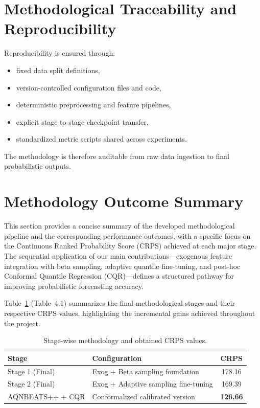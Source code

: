 \section{Methodological Traceability and Reproducibility}
\label{sec:reproducibility}

Reproducibility is ensured through:

\begin{itemize}
  \item fixed data split definitions,
  \item version-controlled configuration files and code,
  \item deterministic preprocessing and feature pipelines,
  \item explicit stage-to-stage checkpoint transfer,
  \item standardized metric scripts shared across experiments.
\end{itemize}

The methodology is therefore auditable from raw data ingestion to final
probabilistic outputs.

\section{Methodology Outcome Summary}
\label{sec:method_outcomes}

This section provides a concise summary of the developed methodological
pipeline and the corresponding performance outcomes, with a specific focus
on the Continuous Ranked Probability Score (CRPS) achieved at each major
stage. The sequential application of our main contributions---exogenous
feature integration with beta sampling, adaptive quantile fine-tuning, and
post-hoc Conformal Quantile Regression (CQR)---defines a structured pathway
for improving probabilistic forecasting accuracy.

Table~\ref{tab:method_stage_summary} (Table~4.1) summarizes the final
methodological stages and their respective CRPS values, highlighting the
incremental gains achieved throughout the project.

\begin{table}[H]
\centering
\caption{Stage-wise methodology and obtained CRPS values.}
\label{tab:method_stage_summary}
\begin{tabular}{llc}
\toprule
\textbf{Stage} & \textbf{Configuration} & \textbf{CRPS} \\
\midrule
Stage 1 (Final) & Exog + Beta sampling foundation & 178.16 \\
Stage 2 (Final) & Exog + Adaptive sampling fine-tuning & 169.39 \\
AQNBEATS++ + CQR & Conformalized calibrated version & \textbf{126.66} \\
\bottomrule
\end{tabular}
\end{table}

